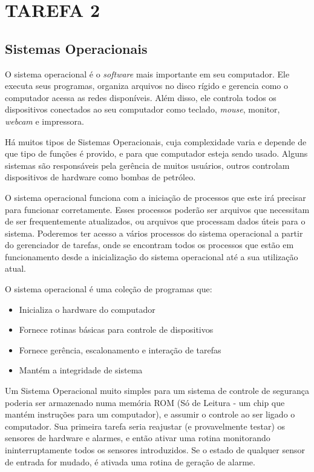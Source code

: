 
\chapter{TAREFA 2}
\label{sec:thread}

\section{Sistemas Operacionais}
\nocite{so}

O sistema operacional é o \textit{software} mais importante em seu computador. Ele executa seus programas, organiza arquivos no disco rígido e gerencia como o computador acessa as redes disponíveis. Além disso, ele controla todos os dispositivos conectados ao seu computador como teclado, \textit{mouse}, monitor, \textit{webcam} e impressora.

Há muitos tipos de Sistemas Operacionais, cuja complexidade varia e depende de que tipo de funções é provido, e para que computador esteja sendo usado. Alguns sistemas são responsáveis pela gerência de muitos usuários, outros controlam dispositivos de hardware como bombas de petróleo.

O sistema operacional funciona com a iniciação de processos que este irá precisar para funcionar corretamente. Esses processos poderão ser arquivos que necessitam de ser frequentemente atualizados, ou arquivos que processam dados úteis para o sistema. Poderemos ter acesso a vários processos do sistema operacional a partir do gerenciador de tarefas, onde se encontram todos os processos que estão em funcionamento desde a inicialização do sistema operacional até a sua utilização atual.

O sistema operacional é uma coleção de programas que:

\begin{itemize}
\item Inicializa o hardware do computador
\item Fornece rotinas básicas para controle de dispositivos
\item Fornece gerência, escalonamento e interação de tarefas
\item Mantém a integridade de sistema
\end{itemize}

Um Sistema Operacional muito simples para um sistema de controle de segurança poderia ser armazenado numa memória ROM (Só de Leitura - um chip que mantém instruções para um computador), e assumir o controle ao ser ligado o computador. Sua primeira tarefa seria reajustar (e provavelmente testar) os sensores de hardware e alarmes, e então ativar uma rotina monitorando ininterruptamente todos os sensores introduzidos. Se o estado de qualquer sensor de entrada for mudado, é ativada uma rotina de geração de alarme.

